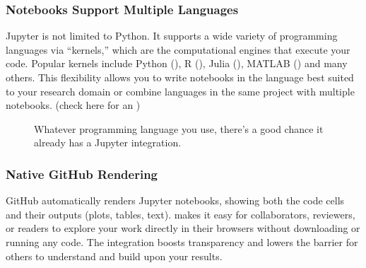 \documentclass[letterpaper,10pt,english]{jupyterBook}
\let\sphinxpxdimen\pdfpxdimen\else\newdimen\sphinxpxdimen
\begin{document}
\subsubsection{Notebooks Support Multiple Languages}
\label{\detokenize{chapters/02/02b_jupyter-notebooks:notebooks-support-multiple-languages}}
\sphinxAtStartPar
Jupyter is not limited to Python. It supports a wide variety of programming languages via “kernels,” which are the computational engines that execute your code. Popular kernels include Python (), R (), Julia (), MATLAB () and many others. This flexibility allows you to write notebooks in the language best suited to your research domain or combine languages in the same project with multiple notebooks. (check here for an )

\begin{figure}[htbp]
\centering
\capstart

\noindent\sphinxincludegraphics[height=400\sphinxpxdimen]{{jlab-launcher}.png}
\caption{Whatever programming language you use, there’s a good chance it already has a Jupyter integration.}\label{\detokenize{chapters/02/02b_jupyter-notebooks:jupyter-kernels}}\end{figure}


\subsubsection{Native GitHub Rendering}
\label{\detokenize{chapters/02/02b_jupyter-notebooks:native-github-rendering}}
\sphinxAtStartPar
GitHub automatically renders Jupyter notebooks, showing both the code cells and their outputs (plots, tables, text).  makes it easy for collaborators, reviewers, or readers to explore your work directly in their browsers without downloading or running any code. The integration boosts transparency and lowers the barrier for others to understand and build upon your results.
\end{document}
